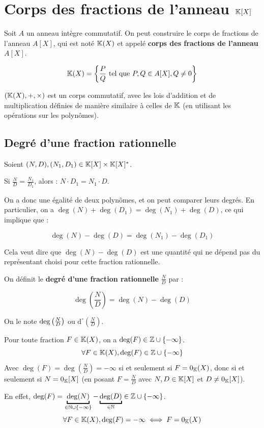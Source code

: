 \documentclass[12pt, a4paper]{report}
\begin{document}
\chapter{Corps des fractions de l'anneau $\mathbb{K}[X]$}

\begin{definition}
    Soit $A$ un anneau intègre commutatif. On peut construire le corps de fractions de l'anneau $A[X]$, qui est noté $\mathbb{K}(X)$ et appelé \textbf{corps des fractions de l'anneau $A[X]$}.

    $$\mathbb{K}(X) = \left\{\frac{P}{Q} \text{ tel que } P, Q \in A[X], Q \neq 0\right\}$$

    $(\mathbb{K}(X), +, \times)$ est un corps commutatif, avec les lois d'addition et de multiplication définies de manière similaire à celles de $\mathbb{K}$ (en utilisant les opérations sur les polynômes).
\end{definition}

\section{Degré d'une fraction rationnelle}

\begin{property}
    Soient $(N,D),(N_1,D_1) \in \mathbb{K}[X]\times\mathbb{K}[X]^*$.

    Si $\frac ND = \frac{N_1}{D_1}$, alors : $N \cdot D_1 = N_1 \cdot D$.

    On a donc une égalité de deux polynômes, et on peut comparer leurs degrés. En particulier, on a $\deg(N) + \deg(D_1) = \deg(N_1) + \deg(D)$, ce qui implique que :

    $$\deg(N) - \deg(D) = \deg(N_1) - \deg(D_1)$$

    Cela veut dire que $\deg(N) - \deg(D)$ est une quantité qui ne dépend pas du représentant choisi pour cette fraction rationnelle.
\end{property}

\begin{definition}
    On définit le \textbf{degré d'une fraction rationnelle} $\frac ND$ par :

    $$\deg\left(\frac ND\right) = \deg(N) - \deg(D)$$

    On le note $\deg\left(\frac ND\right)$ ou $\mathrm d ^\circ (\frac ND)$.
\end{definition}

\begin{remark}
    Pour toute fraction $F \in \mathbb{K}(X)$, on a $\deg(F) \in \mathbb{Z}\cup\{-\infty\}$.
    $$\forall F \in \mathbb{K}(X), \deg(F) \in \mathbb{Z}\cup\{-\infty\}$$
    Avec $\deg(F)= \deg(\frac ND) = -\infty$ si et seulement si $F = 0_{\mathbb{K}}(X)$, donc si et seulement si $N = 0_{\mathbb{K}}[X]$ (en posant $F = \frac ND$ avec $N, D \in \mathbb{K}[X]$ et $D \neq 0_{\mathbb{K}}[X]$).

    En effet, $\deg(F) = \underbracket{\deg(N)}_{\in \N\cup\{-\infty\}} - \underbracket{\deg(D)}_{\in \N} \in \Z\cup\{-\infty\}$.
    $$\forall F \in \mathbb{K}(X), \deg(F) = -\infty \iff F = 0_{\mathbb{K}}(X)$$
\end{remark}
\end{document}
